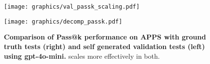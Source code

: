 \begin{figure}[t]
    \centering
    \begin{minipage}{0.465\linewidth}
        \centering
        \texttt{[image: graphics/val\_passk\_scaling.pdf]}
        \vspace{-0.3cm}
    \end{minipage}
    \hfill
    \begin{minipage}{0.515\linewidth}
        \centering
        \vspace{-0.2cm}
        \texttt{[image: graphics/decomp\_passk.pdf]}
    \end{minipage}\vspace{-0.3cm}
    \caption{\textbf{Comparison of Pass@k performance on APPS with ground truth tests (right) and self generated validation tests (left) using gpt-4o-mini.} \decomp scales more effectively  in both.}
    \label{fig:passk_val_comparison}
    \vspace{-0.3cm}
\end{figure}



